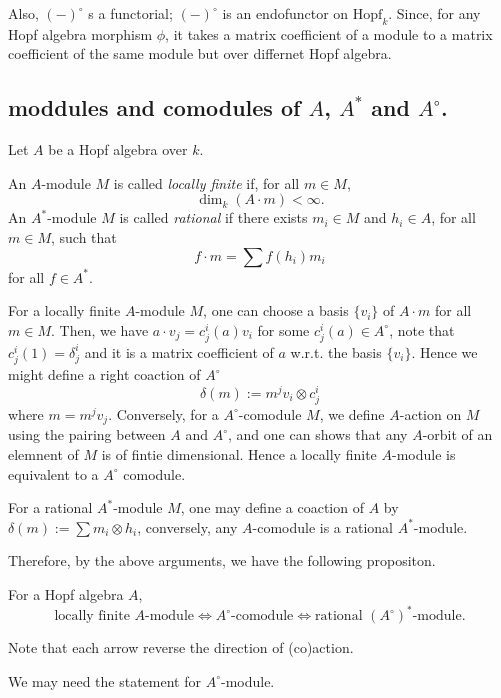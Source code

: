 Also, $(-)^\circ$ s a functorial; $(-)^\circ$ is an endofunctor on $\mathrm{Hopf}_k$.
Since, for any Hopf algebra morphism $\phi$, it takes a matrix coefficient of a module to a matrix coefficient of the same module but over differnet Hopf algebra.


\subsection*{moddules and comodules of $A$, $A^*$ and $A^\circ$.}

Let $A$ be a Hopf algebra over $k$.

\begin{definition}
    An $A$-module $M$ is called \emph{locally finite} if, for all $m \in M$,
    \[
    \dim_k(A \cdot m) < \infty.
    \]
    An $A^*$-module $M$ is called \emph{rational} if there exists $m_i \in M$ and $h_i \in A$, for all $m \in M$, such that
    \[
    f \cdot m = \sum f(h_i)m_i
    \] for all $f \in A^*$.
\end{definition}

For a locally finite $A$-module $M$, one can choose a basis $\{ v_i \}$ of $A \cdot m$ for all $m \in M$.
Then, we have $a \cdot v_j = c^i_j(a) v_i$ for some $c^i_j(a) \in A^\circ$, note that $c^i_j(1) = \delta^i_j$ and it is a matrix coefficient of $a$ w.r.t. the basis $\{v_i\}$.
Hence we might define a right coaction of $A^\circ$
\[
    \delta(m) := m^jv_i \otimes c^i_j
\]
where $m = m^j v_j$.
Conversely, for a $A^\circ$-comodule $M$, we define $A$-action on $M$ using the pairing between $A$ and $A^\circ$, and one can shows that any $A$-orbit of an elemnent of $M$ is of fintie dimensional. 
Hence a locally finite $A$-module is equivalent to a $A^\circ$ comodule.

For a rational $A^*$-module $M$, one may define a coaction of $A$ by $\delta(m) := \sum m_i \otimes h_i$, conversely, any $A$-comodule is a rational $A^*$-module.

Therefore, by the above arguments, we have the following propositon.

\begin{proposition}
    For a Hopf algebra $A$,
    \[
    \text{locally finite } A \text{-module} \Longleftrightarrow A^\circ\text{-comodule} \Longleftrightarrow \text{rational } (A^\circ)^*\text{-module}.
    \]
\end{proposition}
Note that each arrow reverse the direction of (co)action.

We may need the statement for $A^\circ$-module.

